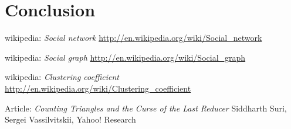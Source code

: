 \documentclass{article}
\begin{document}
\section{Conclusion}

\begin{thebibliography}{1}

    wikipedia:
    \emph{Social network}
    \url{http://en.wikipedia.org/wiki/Social_network}

    wikipedia:
    \emph{Social graph}
    \url{http://en.wikipedia.org/wiki/Social_graph}
    
    wikipedia:
    \emph{Clustering coefficient}
    \url{http://en.wikipedia.org/wiki/Clustering_coefficient}
    
    Article:
    \emph{Counting Triangles and the Curse of the Last Reducer}
    Siddharth Suri,
    Sergei Vassilvitskii,
    Yahoo! Research
\end{thebibliography}
\end{document}
